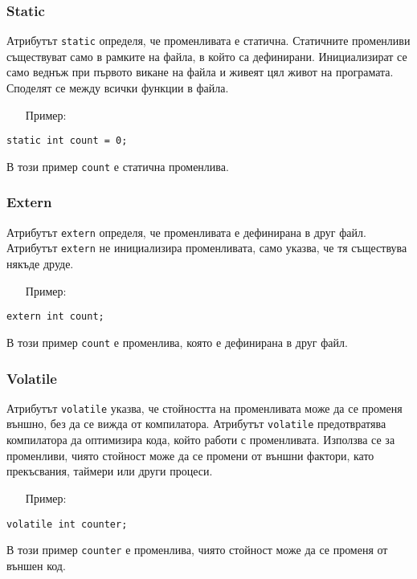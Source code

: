 \documentclass[oneside]{book}
\newcommand*{\code}[1]{\texttt{#1}}
\begin{document}
\subsubsection{Static}
Атрибутът \code{static} определя, че променливата е статична. Статичните променливи съществуват само в рамките на файла, в който са дефинирани. Инициализират се само веднъж при първото викане на файла и живеят цял живот на програмата. Споделят се между всички функции в файла.
\pagebreak
\begin{itemize}
    \item[Пример:]
\end{itemize}
\begin{mdframed}\begin{lstlisting}
static int count = 0;
\end{lstlisting}\end{mdframed}
В този пример \code{count} е статична променлива.

\subsubsection{Extern}
Атрибутът \code{extern} определя, че променливата е дефинирана в друг файл. Атрибутът \code{extern} не инициализира променливата, само указва, че тя съществува някъде друде.

\begin{itemize}
    \item[Пример:]
\end{itemize} 
\begin{mdframed}\begin{lstlisting}
extern int count;
\end{lstlisting}\end{mdframed}
В този пример \code{count} е променлива, която е дефинирана в друг файл.

\subsubsection{Volatile}
Атрибутът \code{volatile} указва, че стойността на променливата може да се променя външно, без да се вижда от компилатора. Атрибутът \code{volatile} предотвратява компилатора да оптимизира кода, който работи с променливата. Използва се за променливи, чиято стойност може да се промени от външни фактори, като прекъсвания, таймери или други процеси.

\begin{itemize}
    \item[Пример:]
\end{itemize} 
\begin{mdframed}\begin{lstlisting}
volatile int counter;
\end{lstlisting}\end{mdframed}
В този пример \code{counter} е променлива, чиято стойност може да се променя от външен код.
\end{document}
